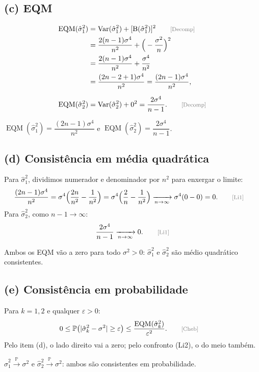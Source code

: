 \documentclass[11pt,a4paper]{article}
\newcommand{\Var}{\operatorname{Var}}
\newcommand{\EQM}{\operatorname{EQM}}
\newcommand{\B}{\operatorname{B}}
\newcommand{\Prob}{\mathbb{P}}
\newcommand{\convP}{\xrightarrow{\;\Prob\;}}
\newcommand{\just}[1]{\tag*{\footnotesize\textcolor{gray}{[#1]}}}
\begin{document}
\subsection*{(c) EQM}
\begin{align*}
\EQM(\hat\sigma^2_1)&=\Var(\hat\sigma^2_1)+[\B(\hat\sigma^2_1)]^2 \just{Decomp}\\
&=\frac{2(n-1)\sigma^4}{n^2}+\Big(-\frac{\sigma^2}{n}\Big)^2\\
&=\frac{2(n-1)\sigma^4}{n^2}+\frac{\sigma^4}{n^2}\\
&=\frac{(2n-2+1)\sigma^4}{n^2}=\frac{(2n-1)\sigma^4}{n^2},\\[6pt]
\EQM(\hat\sigma^2_2)&=\Var(\hat\sigma^2_2)+0^2=\frac{2\sigma^4}{n-1}. \just{Decomp}
\end{align*}
\begin{resposta}
$\EQM(\hat\sigma^2_1)=\dfrac{(2n-1)\sigma^4}{n^2}$ \qquad e \qquad $\EQM(\hat\sigma^2_2)=\dfrac{2\sigma^4}{n-1}$.
\end{resposta}

\subsection*{(d) Consistência em média quadrática}
Para $\hat\sigma^2_1$, dividimos numerador e denominador por $n^2$ para enxergar o limite:
\begin{align*}
\frac{(2n-1)\sigma^4}{n^2}&=\sigma^4\Big(\frac{2n}{n^2}-\frac{1}{n^2}\Big)=\sigma^4\Big(\frac2n-\frac1{n^2}\Big)\xrightarrow[n\to\infty]{}\sigma^4(0-0)=0 . \just{Li1}
\end{align*}
Para $\hat\sigma^2_2$, como $n-1\to\infty$:
\[
\frac{2\sigma^4}{n-1}\xrightarrow[n\to\infty]{}0 . \just{Li1}
\]
\begin{resposta}
Ambos os EQM vão a zero para todo $\sigma^2>0$: $\hat\sigma^2_1$ e $\hat\sigma^2_2$ são médio quadrático consistentes.
\end{resposta}

\subsection*{(e) Consistência em probabilidade}
Para $k=1,2$ e qualquer $\varepsilon>0$:
\begin{align*}
0\le\Prob\big(|\hat\sigma^2_k-\sigma^2|\ge\varepsilon\big)&\le\frac{\EQM(\hat\sigma^2_k)}{\varepsilon^2}. \just{Cheb}
\end{align*}
Pelo item (d), o lado direito vai a zero; pelo confronto (Li2), o do meio também.
\begin{resposta}
$\hat\sigma^2_1\convP\sigma^2$ e $\hat\sigma^2_2\convP\sigma^2$: ambos são consistentes em probabilidade.
\end{resposta}
\end{document}
